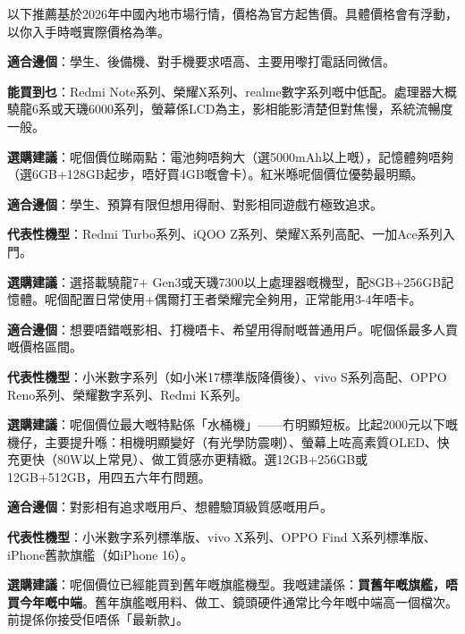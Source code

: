 
以下推薦基於2026年中國內地市場行情，價格為官方起售價。具體價格會有浮動，以你入手時嘅實際價格為準。


\textbf{適合邊個}：學生、後備機、對手機要求唔高、主要用嚟打電話同微信。

\textbf{能買到乜}：Redmi Note系列、榮耀X系列、realme數字系列嘅中低配。處理器大概驍龍6系或天璣6000系列，螢幕係LCD為主，影相能影清楚但對焦慢，系統流暢度一般。

\textbf{選購建議}：呢個價位睇兩點：電池夠唔夠大（選5000mAh以上嘅），記憶體夠唔夠（選6GB+128GB起步，唔好買4GB嘅會卡）。紅米喺呢個價位優勢最明顯。


\textbf{適合邊個}：學生、預算有限但想用得耐、對影相同遊戲冇極致追求。

\textbf{代表性機型}：Redmi Turbo系列、iQOO Z系列、榮耀X系列高配、一加Ace系列入門。

\textbf{選購建議}：選搭載驍龍7+ Gen3或天璣7300以上處理器嘅機型，配8GB+256GB記憶體。呢個配置日常使用+偶爾打王者榮耀完全夠用，正常能用3-4年唔卡。


\textbf{適合邊個}：想要唔錯嘅影相、打機唔卡、希望用得耐嘅普通用戶。呢個係最多人買嘅價格區間。

\textbf{代表性機型}：小米數字系列（如小米17標準版降價後）、vivo S系列高配、OPPO Reno系列、榮耀數字系列、Redmi K系列。

\textbf{選購建議}：呢個價位最大嘅特點係「水桶機」——冇明顯短板。比起2000元以下嘅機仔，主要提升喺：相機明顯變好（有光學防震喇）、螢幕上咗高素質OLED、快充更快（80W以上常見）、做工質感亦更精緻。選12GB+256GB或12GB+512GB，用四五六年冇問題。


\textbf{適合邊個}：對影相有追求嘅用戶、想體驗頂級質感嘅用戶。

\textbf{代表性機型}：小米數字系列標準版、vivo X系列、OPPO Find X系列標準版、iPhone舊款旗艦（如iPhone 16）。

\textbf{選購建議}：呢個價位已經能買到舊年嘅旗艦機型。我嘅建議係：\textbf{買舊年嘅旗艦，唔買今年嘅中端}。舊年旗艦嘅用料、做工、鏡頭硬件通常比今年嘅中端高一個檔次。前提係你接受佢唔係「最新款」。

